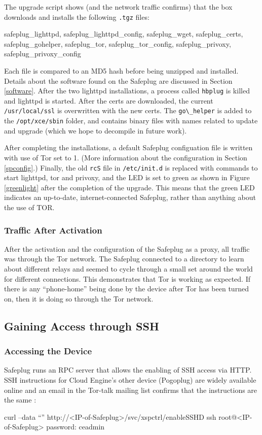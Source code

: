 The upgrade script shows (and the network traffic confirms) that the box downloads and installs the following \verb!.tgz! files: 
\begin{fileName}
safeplug_lighttpd, safeplug_lighttpd_config, safeplug_wget, safeplug_certs, safeplug_gohelper, safeplug_tor, safeplug_tor_config, safeplug_privoxy, safeplug_privoxy_config
\end{fileName}
  Each file is compared to an MD5 hash before being unzipped and installed.  Details about the software found on the Safeplug are discussed in Section \ref{software}.  After the two lighttpd installations, a process called \verb!hbplug! is killed and lighttpd is started.  After the certs are downloaded, the current \verb!/usr/local/ssl! is overwritten with the new certs.  The \verb!go\_helper! is added to the \verb!/opt/xce/sbin! folder, and contains binary files with names related to update and upgrade (which we hope to decompile in future work).

After completing the installations, a default Safeplug configuation file is written with use of Tor set to 1.  (More information about the configuration in Section \ref{spconfig}.)  Finally, the old \verb!rcS! file in \verb!/etc/init.d! is replaced with commands to start lighttpd, tor and privoxy, and the LED is set to green as shown in Figure \ref{greenlight} after the completion of the upgrade. This means that the green LED indicates an up-to-date, internet-connected Safeplug, rather than anything about the use of TOR.

\subsubsection{Traffic After Activation}
After the activation and the configuration of the Safeplug as a proxy, all traffic was through the Tor network.  The Safeplug connected to a directory to learn about different relays and seemed to cycle through a small set around the world for different connections.  This demonstrates that Tor is working as expected.  If there is any ``phone-home'' being done by the device after Tor has been turned on, then it is doing so through the Tor network.


\subsection{Gaining Access through SSH}
\label{sec:SSH}
    \subsubsection{Accessing the Device}
    Safeplug runs an RPC server that allows the enabling of SSH access via HTTP. SSH instructions for Cloud Engine's other device (Pogoplug) are widely available online and an email in the Tor-talk mailing list confirms that the instructions are the same \cite{ceadmin}:
\begin{fileName}
curl --data ``'' http://<IP-of-Safeplug>/svc/xspctrl/enableSSHD
ssh root@<IP-of-Safeplug>
password: ceadmin
\end{fileName}

